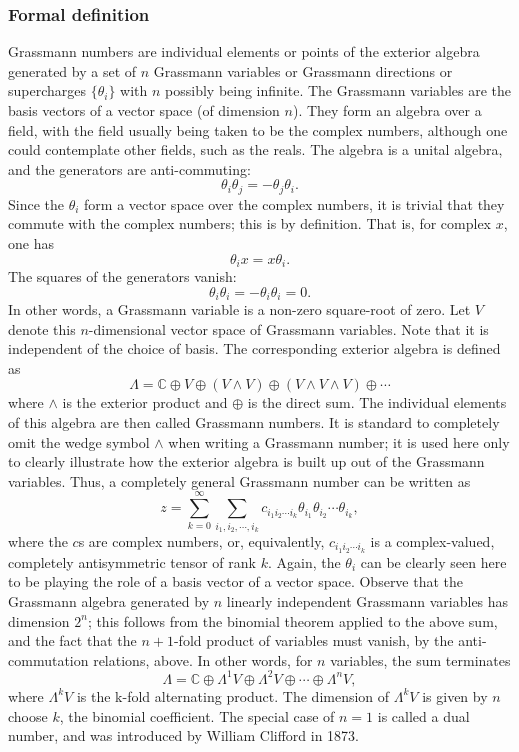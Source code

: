 \subsubsection{Formal definition}
Grassmann numbers are individual elements or points of the exterior algebra generated by a set of $n$ Grassmann variables or Grassmann directions or supercharges $\{\theta _{i}\}$ with $n$ possibly being infinite.
The Grassmann variables are the basis vectors of a vector space (of dimension $n$). 
They form an algebra over a field, with the field usually being taken to be the complex numbers, although one could contemplate other fields, such as the reals. The algebra is a unital algebra, and the generators are anti-commuting:
\[\theta _{i}\theta _{j}=-\theta _{j}\theta _{i}.\]
Since the $\theta _{i}$ form a vector space over the complex numbers, it is trivial that they commute with the complex numbers; this is by definition. That is, for complex $x$, one has
\[\theta _{i}x=x\theta _{i}.\]
The squares of the generators vanish:
\[\theta_i \theta_i = -\theta_i \theta_i = 0.\]
In other words, a Grassmann variable is a non-zero square-root of zero.
Let $V$ denote this $n$-dimensional vector space of Grassmann variables. 
Note that it is independent of the choice of basis. The corresponding exterior algebra is defined as
\[\Lambda =\mathbb {C} \oplus V\oplus \left(V\wedge V\right)\oplus \left(V\wedge V\wedge V\right)\oplus \cdots\]
where $\wedge$ is the exterior product and $\oplus$ is the direct sum. The individual elements of this algebra are then called Grassmann numbers. It is standard to completely omit the wedge symbol $\wedge$ when writing a Grassmann number; it is used here only to clearly illustrate how the exterior algebra is built up out of the Grassmann variables. Thus, a completely general Grassmann number can be written as
\[z=\sum _{k=0}^{\infty }\sum _{i_{1},i_{2},\cdots ,i_{k}}c_{i_{1}i_{2}\cdots i_{k}}\theta _{i_{1}}\theta _{i_{2}}\cdots \theta _{i_{k}},\]
where the $c$s are complex numbers, or, equivalently, $c_{i_{1}i_{2}\cdots i_{k}}$ is a complex-valued, completely antisymmetric tensor of rank $k$. Again, the $\theta _{i}$ can be clearly seen here to be playing the role of a basis vector of a vector space.
Observe that the Grassmann algebra generated by $n$ linearly independent Grassmann variables has dimension $2^n$; this follows from the binomial theorem applied to the above sum, and the fact that the $n+1$-fold product of variables must vanish, by the anti-commutation relations, above. In other words, for $n$ variables, the sum terminates
\[\Lambda =\mathbb {C} \oplus \Lambda ^{1}V\oplus \Lambda ^{2}V\oplus \cdots \oplus \Lambda ^{n}V,\]
where $\Lambda ^{k}V$ is the k-fold alternating product. The dimension of  $\Lambda ^{k}V$ is given by $n$ choose $k$, the binomial coefficient. The special case of $n=1$ is called a dual number, and was introduced by William Clifford in 1873.

